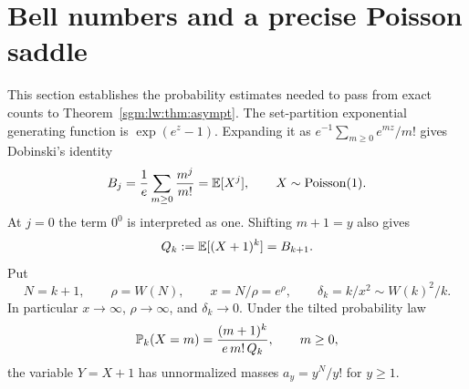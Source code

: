 \documentclass[11pt,letterpaper]{article}
\theoremstyle{remark}\newtheorem{remark}[theorem]{Remark}
\theoremstyle{definition}\newtheorem{definition}[theorem]{Definition}
\begin{document}
\section{Bell numbers and a precise Poisson saddle}
This section establishes the probability estimates needed to pass from exact counts to Theorem~\ref{sgm:lw:thm:asympt}. The set-partition exponential generating function is $\exp(e^z-1)$. Expanding it as $e^{-1}\sum_{m\ge0}e^{mz}/m!$ gives Dobinski's identity
\begin{equation}\label{sgm:lw:eq:Dobinski}
 B_j=\frac1e\sum_{m\ge0}\frac{m^j}{m!}=\mathbb E[X^j],
 \qquad X\sim\operatorname{Poisson}(1).
\end{equation}
At $j=0$ the term $0^0$ is interpreted as one. Shifting $m+1=y$ also gives
\begin{equation}\label{sgm:lw:eq:Q}
 Q_k:=\mathbb E[(X+1)^k]=B_{k+1}.
\end{equation}
Put
\[
 N=k+1,\qquad \rho=W(N),\qquad x=N/\rho=e^\rho,
 \qquad \delta_k=k/x^2\sim W(k)^2/k.
\]
In particular $x\to\infty$, $\rho\to\infty$, and $\delta_k\to0$. Under the tilted probability law
\begin{equation}\label{sgm:lw:eq:tilt}
 \mathbb P_k(X=m)=\frac{(m+1)^k}{e\,m!\,Q_k},\qquad m\ge0,
\end{equation}
the variable $Y=X+1$ has unnormalized masses $a_y=y^N/y!$ for $y\ge1$.
\end{document}
